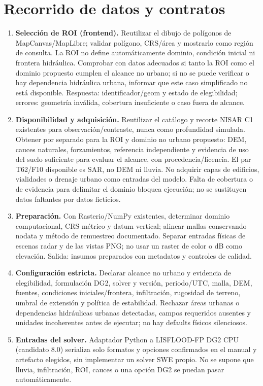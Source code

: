 \documentclass[11pt,a4paper]{article}
\begin{document}
\section{Recorrido de datos y contratos}
\begin{enumerate}
\item \textbf{Selección de ROI (frontend).} Reutilizar el dibujo de polígonos de MapCanvas/MapLibre; validar polígono, CRS/área y mostrarlo como región de consulta. La ROI no define automáticamente dominio, condición inicial ni frontera hidráulica. Comprobar con datos adecuados si tanto la ROI como el dominio propuesto cumplen el alcance no urbano; si no se puede verificar o hay dependencia hidráulica urbana, informar que este caso simplificado no está disponible. Respuesta: identificador/geom y estado de elegibilidad; errores: geometría inválida, cobertura insuficiente o caso fuera de alcance.
\item \textbf{Disponibilidad y adquisición.} Reutilizar el catálogo y recorte NISAR C1 existentes para observación/contraste, nunca como profundidad simulada. Obtener por separado para la ROI y dominio no urbano propuesto: DEM, cauces naturales, forzamientos, referencia independiente y evidencia de uso del suelo suficiente para evaluar el alcance, con procedencia/licencia. El par T62/F10 disponible es SAR, no DEM ni lluvia. No adquirir capas de edificios, vialidades o drenaje urbano como entradas del modelo. Falta de cobertura o de evidencia para delimitar el dominio bloquea ejecución; no se sustituyen datos faltantes por datos ficticios.
\item \textbf{Preparación.} Con Rasterio/NumPy existentes, determinar dominio computacional, CRS métrico y datum vertical; alinear mallas conservando nodata y método de remuestreo documentado. Separar entradas físicas de escenas radar y de las vistas PNG; no usar un raster de color o dB como elevación. Salida: insumos preparados con metadatos y controles de calidad.
\item \textbf{Configuración estricta.} Declarar alcance no urbano y evidencia de elegibilidad, formulación DG2, solver y versión, periodo/UTC, malla, DEM, fuentes, condiciones iniciales/frontera, infiltración, rugosidad de terreno, umbral de extensión y política de estabilidad. Rechazar áreas urbanas o dependencias hidráulicas urbanas detectadas, campos requeridos ausentes y unidades incoherentes antes de ejecutar; no hay defaults físicos silenciosos.
\item \textbf{Entradas del solver.} Adaptador Python a LISFLOOD-FP DG2 CPU (candidato 8.0) serializa solo formatos y opciones confirmados en el manual y artefacto elegidos, sin implementar un solver SWE propio. No se supone que lluvia, infiltración, ROI, cauces o una opción DG2 se puedan pasar automáticamente.

\end{enumerate}
\end{document}
